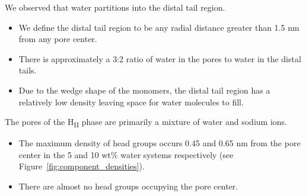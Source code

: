\documentclass{article}
\begin{document}
  \noindent We observed that water partitions into the distal tail region.
  \begin{itemize}
    \item We define the distal tail region to be any radial distance 
    greater than 1.5 nm from any pore center. 
    \item There is approximately a 3:2 ratio of water in the pores to
    water in the distal tails. 
    \item Due to the wedge shape of the monomers, the distal tail region
    has a relatively low density leaving space for water molecules to 
    fill.  
  \end{itemize}
  
  \noindent The pores of the H\textsubscript{II} phase are primarily a 
  mixture of water and sodium ions.
  \begin{itemize}
    \item The maximum density of head groups occurs 0.45 and 0.65 nm from
    the pore center in the 5 and 10 wt\% water systems respectively (see
    Figure~\ref{fig:component_densities}). 
    \item There are almost no head groups occupying the pore center.
  \end{itemize}
  
\end{document}
